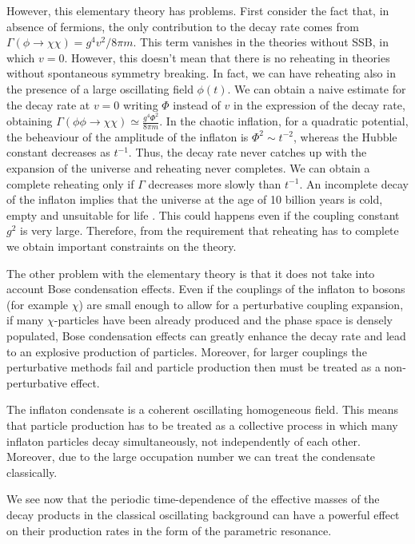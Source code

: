 \documentclass[11pt,a4paper,twoside]{book}
\begin{document}
However, this elementary theory has problems. First consider the fact that, in absence of fermions, the only contribution to the decay rate comes from $\Gamma(\phi \rightarrow \chi \chi) = g^{4}v^{2}/8\pi m $. This term vanishes in the theories without SSB, in which $ v=0 $. However, this doesn't mean that there is no reheating in theories without spontaneous symmetry breaking. In fact, we can have reheating also in the presence of a large oscillating field $\phi(t)$. We can obtain a naive estimate for the decay rate at $ v=0 $ writing $\Phi$ instead of $ v $ in the expression of the decay rate, obtaining $ \Gamma(\phi \phi \rightarrow \chi\chi) \simeq \frac{g^{4}\Phi^{2}}{8\pi m} $. In the chaotic inflation, for a quadratic potential, the beheaviour of the amplitude of the inflaton is $ \Phi^{2}\sim t^{-2} $, whereas the Hubble constant decreases as $ t^{-1} $. Thus, the decay rate never catches up with the expansion of the universe and reheating never completes. We can obtain a complete reheating only if $\Gamma$ decreases more slowly than $ t^{-1} $. An incomplete decay of the inflaton implies that the universe at the age of 10 billion years is cold, empty and unsuitable for life \cite{Chap4:LindePreheatingModel}. This could happens even if the coupling constant $ g^{2} $ is very large. Therefore, from the requirement that reheating has to complete we obtain important constraints on the theory.

The other problem with the elementary theory  is that it does not take into account  Bose condensation effects. Even if the couplings of the inflaton to bosons (for example $ \chi $) are small enough to allow for a perturbative coupling expansion, if many $\chi$-particles have been already produced and the phase space is densely populated, Bose condensation effects can greatly enhance the decay rate and lead to an explosive production of particles. Moreover, for larger couplings the perturbative methods fail and  particle production then must be treated as a non-perturbative effect. 

The inflaton condensate is a coherent oscillating homogeneous field. This means that particle production has to be treated as a collective process in which many inflaton particles decay simultaneously, not independently of each other. Moreover, due to the large occupation number we can treat the condensate classically.

 We see now that the periodic time-dependence of the effective masses of the decay products in the classical oscillating background can have a powerful effect on their production rates in the form of the parametric resonance.
\end{document}
